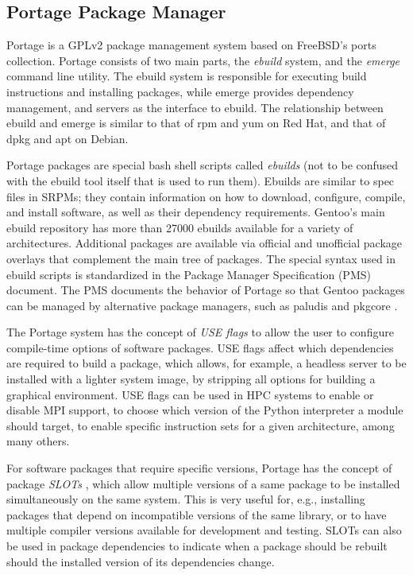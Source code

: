 \documentclass[a4paper,conference]{IEEEtran}
\begin{document}
\subsection{Portage Package Manager}
\label{sec:ebuild}

Portage is a GPLv2 package management system based on FreeBSD's ports
collection. Portage consists of two main parts, the \emph{ebuild}
system, and the \emph{emerge} command line utility. The ebuild system is
responsible for executing build instructions and installing packages,
while emerge provides dependency management, and servers as the
interface to ebuild. The relationship between ebuild and emerge is
similar to that of rpm and yum on Red Hat, and that of dpkg and apt on
Debian.

Portage packages are special bash shell scripts called \emph{ebuilds}
(not to be confused with the ebuild tool itself that is used to run
them). Ebuilds are similar to spec files in SRPMs; they contain
information on how to download, configure, compile, and install
software, as well as their dependency requirements. Gentoo's main ebuild
repository has more than 27000 ebuilds available for a variety of
architectures. Additional packages are available via official and
unofficial package overlays that complement the main tree of packages.
The special syntax used in ebuild scripts is standardized in the Package
Manager Specification (PMS) \cite{gentoo:pms} document. The PMS
documents the behavior of Portage so that Gentoo packages can be managed
by alternative package managers, such as paludis \cite{paludis} and pkgcore \cite{pkgcore}.

The Portage system has the concept of \emph{USE flags} to allow the user
to configure compile-time options of software packages. USE flags affect
which dependencies are required to build a package, which allows, for
example, a headless server to be installed with a lighter system image,
by stripping all options for building a graphical environment. USE flags
can be used in HPC systems to enable or disable MPI support, to choose
which version of the Python interpreter a module should target, to
enable specific instruction sets for a given architecture, among many
others.

For software packages that require specific versions, Portage has the
concept of package \emph{SLOTs} \cite[p.~27]{gentoo:pms}, which allow multiple versions of a same
package to be installed simultaneously on the same system. This is very
useful for, e.g., installing packages that depend on incompatible
versions of the same library, or to have multiple compiler versions
available for development and testing. SLOTs can also be used in package
dependencies to indicate when a package should be rebuilt should the
installed version of its dependencies change.
\end{document}
